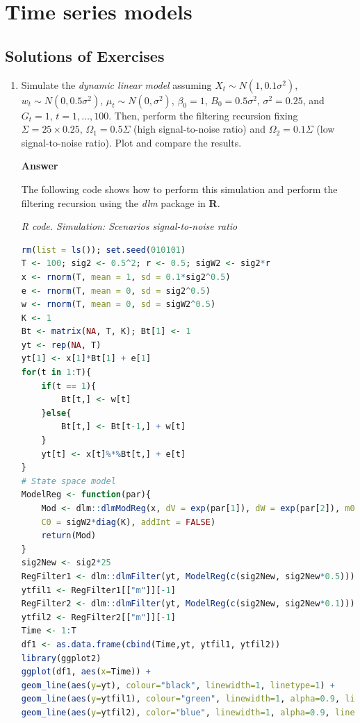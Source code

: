 \chapter{Time series models}\label{chap8}

\section*{Solutions of Exercises}\label{sec81}
\begin{enumerate}[leftmargin=*]
	
	\item Simulate the \textit{dynamic linear model} assuming $X_t\sim N(1, 0.1\sigma^2)$, $w_t\sim N(0, 0.5\sigma^2)$, $\mu_t\sim N(0, \sigma^2)$, $\beta_0=1$, ${B}_0=0.5\sigma^2$, $\sigma^2=0.25$, and ${G}_t=1$, $t=1,\dots,100$. Then, perform the filtering recursion fixing $\Sigma=25\times 0.25$, $\Omega_1=0.5\Sigma$ (high signal-to-noise ratio) and  $\Omega_2=0.1\Sigma$ (low signal-to-noise ratio). Plot and compare the results. 	
	
	\textbf{Answer}
	
	The following code shows how to perform this simulation and perform the filtering recursion using the \textit{dlm} package in \textbf{R}. 
	
	\begin{tcolorbox}[enhanced,width=4.67in,center upper,
		fontupper=\large\bfseries,drop shadow southwest,sharp corners]
		\textit{R code. Simulation: Scenarios signal-to-noise ratio}
		\begin{VF}
			\begin{lstlisting}[language=R]
rm(list = ls()); set.seed(010101)
T <- 100; sig2 <- 0.5^2; r <- 0.5; sigW2 <- sig2*r
x <- rnorm(T, mean = 1, sd = 0.1*sig2^0.5) 
e <- rnorm(T, mean = 0, sd = sig2^0.5)
w <- rnorm(T, mean = 0, sd = sigW2^0.5)
K <- 1 
Bt <- matrix(NA, T, K); Bt[1] <- 1
yt <- rep(NA, T) 
yt[1] <- x[1]*Bt[1] + e[1]
for(t in 1:T){
	if(t == 1){
		Bt[t,] <- w[t]
	}else{
		Bt[t,] <- Bt[t-1,] + w[t]
	}
	yt[t] <- x[t]%*%Bt[t,] + e[t]
}
# State space model
ModelReg <- function(par){
	Mod <- dlm::dlmModReg(x, dV = exp(par[1]), dW = exp(par[2]), m0 = rep(1, K),
	C0 = sigW2*diag(K), addInt = FALSE)
	return(Mod)
}
sig2New <- sig2*25
RegFilter1 <- dlm::dlmFilter(yt, ModelReg(c(sig2New, sig2New*0.5)))
ytfil1 <- RegFilter1[["m"]][-1]
RegFilter2 <- dlm::dlmFilter(yt, ModelReg(c(sig2New, sig2New*0.1)))
ytfil2 <- RegFilter2[["m"]][-1]
Time <- 1:T
df1 <- as.data.frame(cbind(Time,yt, ytfil1, ytfil2))
library(ggplot2)
ggplot(df1, aes(x=Time)) +
geom_line(aes(y=yt), colour="black", linewidth=1, linetype=1) +
geom_line(aes(y=ytfil1), colour="green", linewidth=1, alpha=0.9, linetype=2) +
geom_line(aes(y=ytfil2), color="blue", linewidth=1, alpha=0.9, linetype=3)\end{lstlisting}
		\end{VF}
	\end{tcolorbox}


\end{enumerate}
